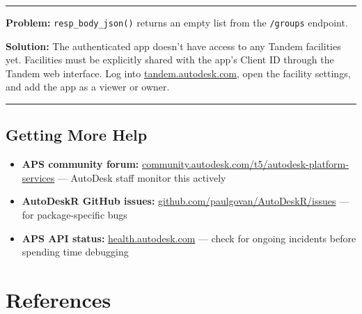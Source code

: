 \documentclass[
  11pt,
  letterpaper,
  DIV=11,
  numbers=noendperiod]{scrreprt}
\providecommand{\tightlist}{%
  \setlength{\itemsep}{0pt}\setlength{\parskip}{0pt}}
\begin{document}
\begin{center}\rule{0.5\linewidth}{0.5pt}\end{center}

\textbf{Problem:} \texttt{resp\_body\_json()} returns an empty list from
the \texttt{/groups} endpoint.

\textbf{Solution:} The authenticated app doesn't have access to any
Tandem facilities yet. Facilities must be explicitly shared with the
app's Client ID through the Tandem web interface. Log into
\href{https://tandem.autodesk.com}{tandem.autodesk.com}, open the
facility settings, and add the app as a viewer or owner.

\begin{center}\rule{0.5\linewidth}{0.5pt}\end{center}

\section{Getting More Help}\label{getting-more-help}

\begin{itemize}
\tightlist
\item
  \textbf{APS community forum:}
  \href{https://community.autodesk.com/t5/autodesk-platform-services/ct-p/217}{community.autodesk.com/t5/autodesk-platform-services}
  --- AutoDesk staff monitor this actively
\item
  \textbf{AutoDeskR GitHub issues:}
  \href{https://github.com/paulgovan/AutoDeskR/issues}{github.com/paulgovan/AutoDeskR/issues}
  --- for package-specific bugs
\item
  \textbf{APS API status:}
  \href{https://health.autodesk.com/}{health.autodesk.com} --- check for
  ongoing incidents before spending time debugging
\end{itemize}


\chapter*{References}\label{references}

\end{document}
